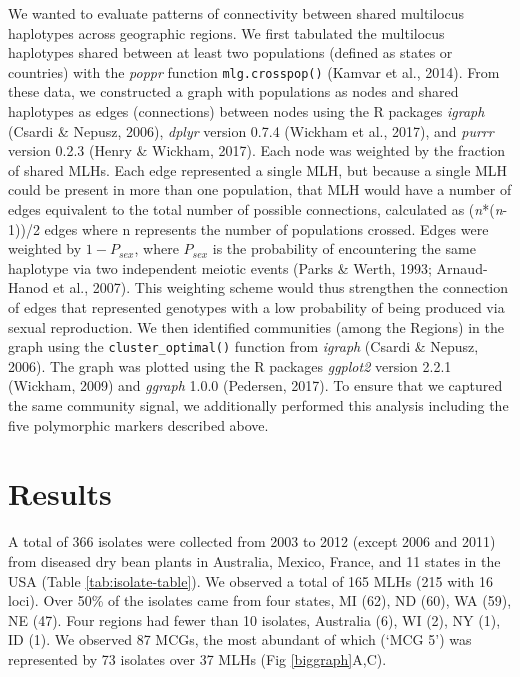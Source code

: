\documentclass[fleqn,10pt,lineno]{wlpeerj} %
\theoremstyle{definition}
\theoremstyle{definition}
\theoremstyle{definition}
\theoremstyle{remark}
\begin{document}
We wanted to evaluate patterns of connectivity between shared multilocus
haplotypes across geographic regions. We first tabulated the multilocus
haplotypes shared between at least two populations (defined as states or
countries) with the \emph{poppr} function \texttt{mlg.crosspop()}
(Kamvar et al., 2014). From these data, we constructed a graph with
populations as nodes and shared haplotypes as edges (connections)
between nodes using the R packages \emph{igraph} (Csardi \& Nepusz,
2006), \emph{dplyr} version 0.7.4 (Wickham et al., 2017), and
\emph{purrr} version 0.2.3 (Henry \& Wickham, 2017). Each node was
weighted by the fraction of shared MLHs. Each edge represented a single
MLH, but because a single MLH could be present in more than one
population, that MLH would have a number of edges equivalent to the
total number of possible connections, calculated as
(\emph{n}*(\emph{n}-1))/2 edges where n represents the number of
populations crossed. Edges were weighted by \(1-P_{sex}\), where
\(P_{sex}\) is the probability of encountering the same haplotype via
two independent meiotic events (Parks \& Werth, 1993; Arnaud-Hanod et
al., 2007). This weighting scheme would thus strengthen the connection
of edges that represented genotypes with a low probability of being
produced via sexual reproduction. We then identified communities (among
the Regions) in the graph using the \texttt{cluster\_optimal()} function
from \emph{igraph} (Csardi \& Nepusz, 2006). The graph was plotted using
the R packages \emph{ggplot2} version 2.2.1 (Wickham, 2009) and
\emph{ggraph} 1.0.0 (Pedersen, 2017). To ensure that we captured the
same community signal, we additionally performed this analysis including
the five polymorphic markers described above.

\section*{Results}\label{results}

A total of 366 isolates were collected from 2003 to 2012 (except 2006
and 2011) from diseased dry bean plants in Australia, Mexico, France,
and 11 states in the USA (Table \ref{tab:isolate-table}). We observed a
total of 165 MLHs (215 with 16 loci). Over 50\% of the isolates came
from four states, MI (62), ND (60), WA (59), NE (47). Four regions had
fewer than 10 isolates, Australia (6), WI (2), NY (1), ID (1). We
observed 87 MCGs, the most abundant of which (`MCG 5') was represented
by 73 isolates over 37 MLHs (Fig \ref{biggraph}A,C).
\end{document}
